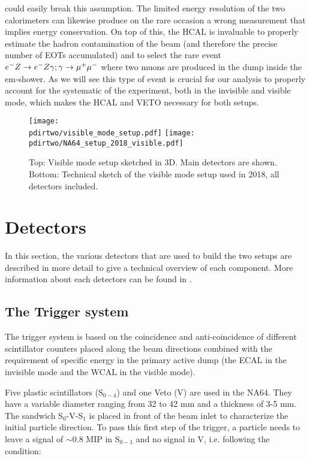 could easily break this assumption. The limited energy resolution of the two calorimeters can likewise produce on the rare occasion a wrong measurement that implies energy conservation. On top of this, the HCAL is invaluable to properly estimate the hadron contamination of the beam (and therefore the precise number of EOTs accumulated) and to select the rare event $e^- Z \to e^- Z \gamma; \gamma \to \mu^+ \mu^-$ where two muons are produced in the dump inside the em-shower. As we will see this type of event is crucial for our analysis to properly account for the systematic of the experiment, both in the invisible and visible mode, which makes the HCAL and VETO necessary for both setups.

\begin{figure}[tb]
  \centering
  \texttt{[image: \\pdirtwo/visible\_mode\_setup.pdf]}  
  \texttt{[image: \\pdirtwo/NA64\_setup\_2018\_visible.pdf]}
  \caption[NA64 visible mode setup 2018]{Top: Visible mode setup sketched in 3D. Main detectors are shown. Bottom: Technical sketch of the visible mode setup used in 2018, all detectors included.}
  \label{fig:setup-vis-2018}
\end{figure}

\section{Detectors}
\label{ch2:sec:detectors}

In this section, the various detectors that are used to build the two setups are described in more detail to give a technical overview of each component. More information about each detectors can be found in \cite{na64-hcal,na64-detectors,ABBON201569}. 

\subsection{The Trigger system}
\label{ch2:sec:detectors-trigger}

The trigger system is based on the coincidence and anti-coincidence of different scintillator counters placed along the beam directions combined with the requirement of specific energy in the primary active dump (the ECAL in the invisible mode and the WCAL in the visible mode).

Five plastic scintillators (S$_{0-4}$) and one Veto (V) are used in the NA64. They have a variable diameter ranging from 32 to 42 \si{mm} and a thickness of 3-5 \si{mm}. The sandwich S$_0$-V-S$_1$ is placed in front of the beam inlet to characterize the initial particle direction. To pass this first step of the trigger, a particle needs to leave a signal of $\sim$0.8 MIP in S$_{0-1}$ and no signal in V, i.e. following the condition:

